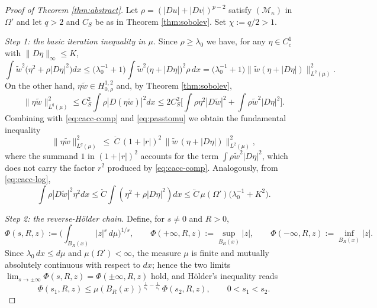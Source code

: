 \documentclass[10pt,a4paper]{amsart}
\begin{document}
\begin{proof}[Proof of Theorem \ref{thm:abstract}]
Let $\rho=(|Du|+|Dv|)^{p-2}$ satisfy $(\mathcal M_\kappa)$ in $\Omega'$ and let $q>2$ and $C_S$ be
as in Theorem \ref{thm:sobolev}. Set $\chi:=q/2>1$.

\emph{Step 1: the basic iteration inequality in $\mu$.} Since $\rho\ge\lambda_0$ we have, for any
$\eta\in C_c^1$ with $\|D\eta\|_\infty\le K$,
\begin{equation}\label{eq:passtomu}
\int \widetilde w^{2}\big(\eta^2+\rho|D\eta|^2\big)dx
\le \big(\lambda_0^{-1}+1\big)\int \widetilde w^{2}\big(\eta+|D\eta|\big)^2\rho\,dx
=\big(\lambda_0^{-1}+1\big)\big\|\widetilde w(\eta+|D\eta|)\big\|_{L^2(\mu)}^2 .
\end{equation}
On the other hand, $\eta\widetilde w\in H^{1,2}_{0,\rho}$ and, by Theorem \ref{thm:sobolev},
\[
\|\eta\widetilde w\|_{L^{q}(\mu)}^2\le C_S^2\int\rho|D(\eta\widetilde w)|^2dx
\le 2C_S^2\Big[\int\rho\eta^2|D\widetilde w|^2+\int\rho\widetilde w^2|D\eta|^2\Big].
\]
Combining with \eqref{eq:cacc-comp} and \eqref{eq:passtomu} we obtain the fundamental inequality
\begin{equation}\label{eq:fundamental}
\|\eta\widetilde w\|_{L^{q}(\mu)}^2\ \le\ \ddot C\,(1+|r|)^2\,\big\|\widetilde w\,(\eta+|D\eta|)\big\|_{L^2(\mu)}^2 ,
\end{equation}
where the summand $1$ in $(1+|r|)^2$ accounts for the term $\int\rho\widetilde w^2|D\eta|^2$, which
does not carry the factor $r^2$ produced by \eqref{eq:cacc-comp}.
Analogously, from \eqref{eq:cacc-log},
\begin{equation}\label{eq:fundamental-log}
\int\rho|D\widetilde w|^2\eta^2dx\le \ddot C\int(\eta^2+\rho|D\eta|^2)dx\le \ddot C\,\mu(\Omega')\big(\lambda_0^{-1}+K^2\big) .
\end{equation}

\emph{Step 2: the reverse-H\"older chain.} Define, for $s\ne0$ and $R>0$,
\[
\Phi(s,R,z):=\Big(\int_{B_R(x)}|z|^{s}\,d\mu\Big)^{1/s},\qquad
\Phi(+\infty,R,z):=\sup_{B_R(x)}|z|,\qquad \Phi(-\infty,R,z):=\inf_{B_R(x)}|z| .
\]
Since $\lambda_0\,dx\le d\mu$ and $\mu(\Omega')<\infty$, the measure $\mu$ is finite and mutually
absolutely continuous with respect to $dx$; hence the two limits
$\lim_{s\to\pm\infty}\Phi(s,R,z)=\Phi(\pm\infty,R,z)$ hold, and H\"older's inequality reads
\begin{equation}\label{eq:holderPhi}
\Phi(s_1,R,z)\le\mu(B_R(x))^{\frac1{s_1}-\frac1{s_2}}\,\Phi(s_2,R,z),\qquad 0<s_1<s_2 .
\end{equation}


\end{proof}
\end{document}
